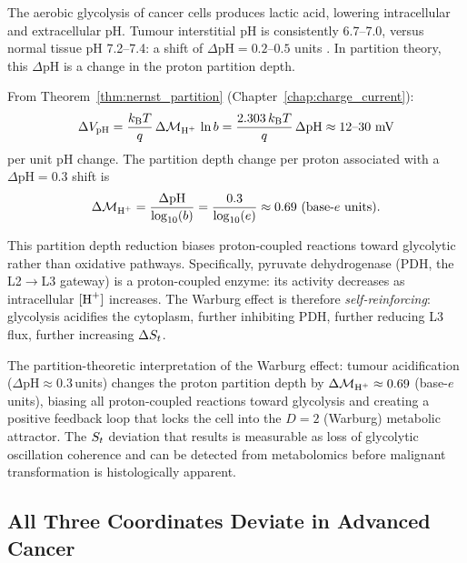 The aerobic glycolysis of cancer cells produces lactic acid, lowering
intracellular and extracellular pH. Tumour interstitial pH is consistently
6.7--7.0, versus normal tissue pH 7.2--7.4: a shift of $\Delta\mathrm{pH} = 0.2$--$0.5$
units \citep{Gatenby2007}. In partition theory, this $\Delta\mathrm{pH}$ is a
change in the proton partition depth.

From Theorem~\ref{thm:nernst_partition} (Chapter~\ref{chap:charge_current}):
\begin{equation}
  \Delta V_{\mathrm{pH}} = \frac{\kB T}{q}\,\Delta\Depth_{\ce{H+}}\,\ln b
    = \frac{2.303\,\kB T}{q}\,\Delta\mathrm{pH}
    \approx 12\text{--}30\ \mathrm{mV}
\end{equation}
per unit pH change. The partition depth change per proton associated with a
$\Delta\mathrm{pH} = 0.3$ shift is
\begin{equation}
  \Delta\Depth_{\ce{H+}}
    = \frac{\Delta\mathrm{pH}}{\log_{10}(b)}
    = \frac{0.3}{\log_{10}(e)}
    \approx 0.69\ \text{(base-$e$ units)}.
  \label{eq:warburg_depth_change}
\end{equation}

This partition depth reduction biases proton-coupled reactions toward glycolytic
rather than oxidative pathways. Specifically, pyruvate dehydrogenase (PDH,
the L2$\to$L3 gateway) is a proton-coupled enzyme: its activity decreases as
intracellular $[\ce{H+}]$ increases. The Warburg effect is therefore
\emph{self-reinforcing}: glycolysis acidifies the cytoplasm, further inhibiting
PDH, further reducing L3 flux, further increasing $\Delta S_t$.

\begin{keyresult}
The partition-theoretic interpretation of the Warburg effect:
tumour acidification ($\Delta\mathrm{pH} \approx 0.3$\,units) changes the proton
partition depth by $\Delta\Depth_{\ce{H+}} \approx 0.69$ (base-$e$ units),
biasing all proton-coupled reactions toward glycolysis and creating a positive
feedback loop that locks the cell into the $D = 2$ (Warburg) metabolic attractor.
The $S_t$ deviation that results is measurable as loss of glycolytic oscillation
coherence and can be detected from metabolomics before malignant transformation
is histologically apparent.
\end{keyresult}

\subsection{All Three Coordinates Deviate in Advanced Cancer}
\label{ssec:cancer_all_three}

